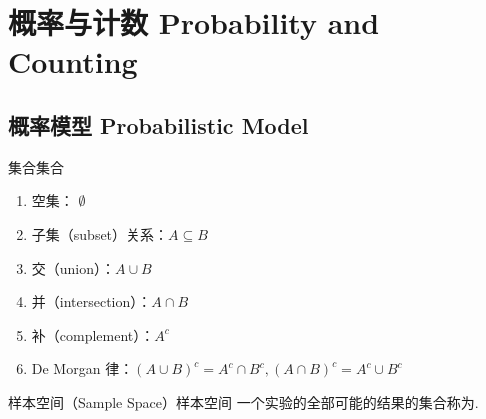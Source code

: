 






\chapter{概率与计数 Probability and Counting}

\section{概率模型 Probabilistic Model}

\begin{definition}{集合}{集合}
    
    \begin{enumerate}
        \item 空集： $\emptyset$
        \item 子集（subset）关系：$A \subseteq B$
        \item 交（union）：$A \cup B$
        \item 并（intersection）：$A \cap B$
        \item 补（complement）：$A^c$
        \item De Morgan 律：$(A \cup B)^c = A^c \cap B^c, (A \cap B)^c = A^c \cup B^c$
    \end{enumerate}
    
\end{definition}

\begin{definition}{样本空间（Sample Space）}{样本空间}
    一个实验的全部可能的结果的集合称为.
\end{definition}

